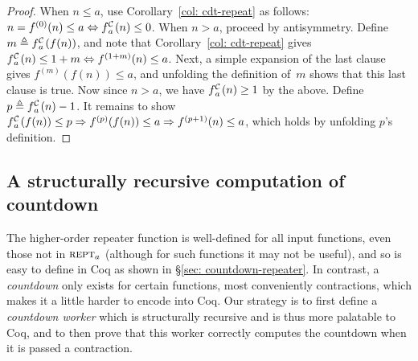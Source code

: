 \begin{proof}
When $n \le a$, use Corollary~\ref{col: cdt-repeat} as follows:
$n = f^{(0)}(n)\le a \iff \cdt{f}{a}(n)\le 0$.
When $n > a$, proceed by antisymmetry.
Define $m \triangleq \cdt{f}{a}(f(n))$, and note that
Corollary~\ref{col: cdt-repeat} gives
$\cdt{f}{a}(n)\le 1+m \iff f^{(1+m)}(n) \le a$.
Next, a simple expansion of the last clause gives $f^{(m)}(f(n)) \le a$,
and unfolding the definition of~$m$ shows that this last clause is true.
Now since $n > a$, we have $\cdt{f}{a}(n)\ge 1$ by the above.
Define $p \triangleq \cdt{f}{a}(n) - 1$.
It remains to show $\cdt{f}{a}(f(n))\le p \Rightarrow 
\linebreak f^{(p)}(f(n))\le a \Rightarrow f^{(p+1)}(n)\le a$, which holds by unfolding $p$'s definition.
\end{proof}


\subsection{A structurally recursive computation of countdown}

The higher-order repeater function is well-defined for all input functions,
even those not in $\text{\scshape{rept}}_a$ (although for such functions it may not
be useful), and so is easy to define
in Coq as shown in \S\ref{sec: countdown-repeater}. In contrast, a
\emph{countdown} only exists for certain functions, most conveniently
contractions, which makes it a little harder to encode into Coq.
Our strategy is to first define a \emph{countdown worker} which is
structurally recursive and is thus more palatable to Coq, and to then
prove that this worker correctly computes the countdown when it is 
passed a contraction.

